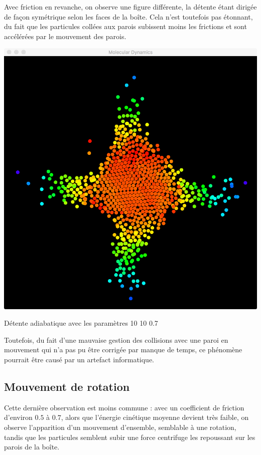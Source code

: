 \documentclass{tufte-handout}
\begin{document}
  Avec friction en revanche, on observe une figure différente, la détente étant dirigée de façon symétrique selon les faces de la boîte. Cela n'est toutefois pas étonnant, du fait que les particules collées aux parois subissent moins les frictions et sont accélérées par le mouvement des parois.
  \begin{marginfigure}
    \includegraphics[width=\linewidth]{figures/adiabaticwithfriction.png}
    \caption{Détente adiabatique avec les paramètres 10 10 0.7}
  \end{marginfigure}
  Toutefois, du fait d'une mauvaise gestion des collisions avec une paroi en mouvement qui n'a pas pu être corrigée par manque de temps, ce phénomène pourrait être causé par un artefact informatique.


  \subsection{Mouvement de rotation}
  Cette dernière observation est moins commune : avec un coefficient de friction d'environ $0.5$ à $0.7$, alors que l'énergie cinétique moyenne devient très faible, on observe l'apparition d'un mouvement d'ensemble, semblable à une rotation, tandis que les particules semblent subir une force centrifuge les repoussant sur les parois de la boîte.
\end{document}
